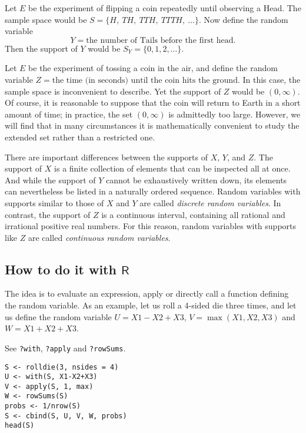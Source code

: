 Let \(E\) be the experiment of flipping a coin repeatedly until
observing a Head. The sample space would be \(S= \{ H,\ TH,\ TTH,\
TTTH,\ \ldots \} \).
Now define the random variable
\[ Y=\mbox{the number of Tails before the first head} .\]
Then the support of \(Y\)
would be \( S_{Y}= \{ 0,1,2,\ldots \} \).



Let \(E\) be the experiment of tossing a coin in the air, and define
the random variable \( Z = \mbox{the time (in seconds) until the coin
hits the ground} \). In this case, the sample space is inconvenient to
describe. Yet the support of \(Z\) would be \((0,\infty)\). Of course,
it is reasonable to suppose that the coin will return to Earth in a
short amount of time; in practice, the set \((0,\infty)\) is
admittedly too large. However, we will find that in many circumstances
it is mathematically convenient to study the extended set rather than
a restricted one.


There are important differences between the supports of \(X\), \(Y\),
and \(Z\). The support of \(X\) is a finite collection of elements
that can be inspected all at once. And while the support of \(Y\)
cannot be exhaustively written down, its elements can nevertheless be
listed in a naturally ordered sequence. Random variables with supports
similar to those of \(X\) and \(Y\) are called \emph{discrete random
variables}.
In contrast, the support of \(Z\) is a continuous interval, containing
all rational and irrational positive real numbers. For this
reason, random variables with supports like \(Z\) are
called \emph{continuous random variables}.

\subsection{How to do it with \(\mathsf{R}\)}
\label{sec-4-9-1}

The idea is to evaluate an expression, apply or directly call a function defining the random variable.
As an example, let us roll a 4-sided die three times, and
let us define the random variable \(U=X1-X2+X3\), \(V=\max(X1,X2,X3)\) and \(W=X1+X2+X3\).

See \texttt{?with}, \texttt{?apply} and \texttt{?rowSums}.

\begin{Verbatim}
S <- rolldie(3, nsides = 4)
U <- with(S, X1-X2+X3)
V <- apply(S, 1, max)
W <- rowSums(S)
probs <- 1/nrow(S)
S <- cbind(S, U, V, W, probs)
head(S)
\end{Verbatim}

